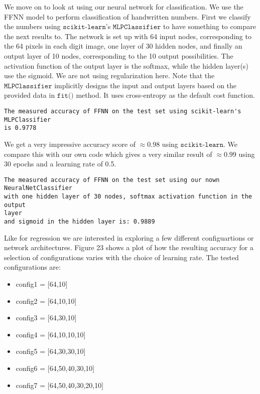 \documentclass[11pt]{article}
\providecommand{\tightlist}{%
      \setlength{\itemsep}{0pt}\setlength{\parskip}{0pt}}
\begin{document}
We move on to look at using our neural network for classification. We
use the FFNN model to perform classification of handwritten numbers.
First we classify the numbers using \(\texttt{scikit-learn}\)'s
\(\texttt{MLPClassifier}\) to have something to compare the next results
to. The network is set up with 64 input nodes, corresponding to the 64
pixels in each digit image, one layer of 30 hidden nodes, and finally an
output layer of 10 nodes, corresponding to the 10 output possibilities.
The activation function of the output layer is the softmax, while the
hidden layer(s) use the sigmoid. We are not using regularization here.
Note that the \(\texttt{MLPClassifier}\) implicitly designs the input
and output layers based on the provided data in \(\texttt{fit()}\)
method. It uses cross-entropy as the default cost function.

    \begin{Verbatim}[commandchars=\\\{\}]
The measured accuracy of FFNN on the test set using scikit-learn's MLPClassifier
is 0.9778
    \end{Verbatim}

    We get a very impressive accuracy score of \(\approx0.98\) using
\(\texttt{scikit-learn}\). We compare this with our own code which gives
a very similar result of \(\approx0.99\) using 30 epochs and a learning
rate of 0.5.

    \begin{Verbatim}[commandchars=\\\{\}]
The measured accuracy of FFNN on the test set using our nown NeuralNetClassifier
with one hidden layer of 30 nodes, softmax activation function in the output
layer
and sigmoid in the hidden layer is: 0.9889
    \end{Verbatim}

    Like for regression we are interested in exploring a few different
configuartions or network architectures. Figure 23 shows a plot of how
the resulting accuracy for a selection of configurations varies with the
choice of learning rate. The tested configurations are:

\begin{itemize}
\tightlist
\item
  config1 = {[}64,10{]}
\item
  config2 = {[}64,10,10{]}
\item
  config3 = {[}64,30,10{]}
\item
  config4 = {[}64,10,10,10{]}
\item
  config5 = {[}64,30,30,10{]}
\item
  config6 = {[}64,50,40,30,10{]}
\item
  config7 = {[}64,50,40,30,20,10{]}
\end{itemize}
\end{document}

